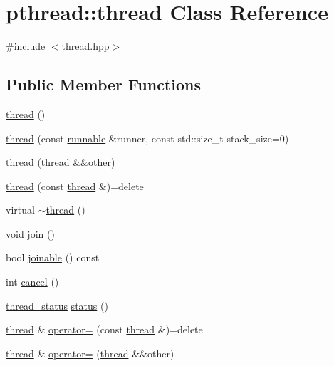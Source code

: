 \hypertarget{classpthread_1_1thread}{\section{pthread\+:\+:thread Class Reference}
\label{classpthread_1_1thread}
}


{\ttfamily \#include $<$thread.\+hpp$>$}

\subsection*{Public Member Functions}
\begin{DoxyCompactItemize}
\item 
\hyperlink{classpthread_1_1thread_a60ac91ccf3de6e36258aa741af015095}{thread} ()
\item 
\hyperlink{classpthread_1_1thread_aaf360cff96e50499872bd147e85ba3ac}{thread} (const \hyperlink{classpthread_1_1runnable}{runnable} \&runner, const std\+::size\+\_\+t stack\+\_\+size=0)
\item 
\hyperlink{classpthread_1_1thread_a928b41a7587eba3e5e39237b4b2f655a}{thread} (\hyperlink{classpthread_1_1thread}{thread} \&\&other)
\item 
\hyperlink{classpthread_1_1thread_ab9ddf5aa6697287269dc2804051b6378}{thread} (const \hyperlink{classpthread_1_1thread}{thread} \&)=delete
\item 
virtual \hyperlink{classpthread_1_1thread_aa4920e15c3a033f94c6be462c5cbcecf}{$\sim$thread} ()
\item 
void \hyperlink{classpthread_1_1thread_a90ab4afc041cf26d9fd4b289bf0224c8}{join} ()
\item 
bool \hyperlink{classpthread_1_1thread_a14b07d05a78157bcb5ee42fc8dd17e35}{joinable} () const 
\item 
int \hyperlink{classpthread_1_1thread_a89b64810871feee5c2d2659f3ae2f668}{cancel} ()
\item 
\hyperlink{group__threads_gac4b6e78f3d72c946ace7a92f3bec4101}{thread\+\_\+status} \hyperlink{classpthread_1_1thread_a3e49c7d73cb8411258790ed2fc0cd818}{status} ()
\item 
\hyperlink{classpthread_1_1thread}{thread} \& \hyperlink{classpthread_1_1thread_a09903f6b3f396f2ea046c9c1606f0f61}{operator=} (const \hyperlink{classpthread_1_1thread}{thread} \&)=delete
\item 
\hyperlink{classpthread_1_1thread}{thread} \& \hyperlink{classpthread_1_1thread_a8f9ab7d43ad9aee0368ccc4778cf40d0}{operator=} (\hyperlink{classpthread_1_1thread}{thread} \&\&other)
\end{DoxyCompactItemize}


